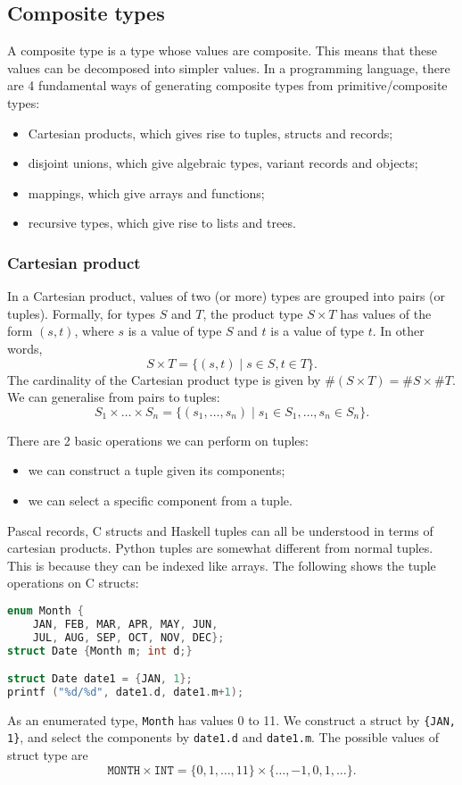 \documentclass[a4paper, openany]{memoir}
\begin{document}
\subsection{Composite types}
A composite type is a type whose values are composite. This means that these values can be decomposed into simpler values. In a programming language, there are 4 fundamental ways of generating composite types from primitive/composite types:
\begin{itemize}
    \item Cartesian products, which gives rise to tuples, structs and records;
    \item disjoint unions, which give algebraic types, variant records and objects;
    \item mappings, which give arrays and functions;
    \item recursive types, which give rise to lists and trees.
\end{itemize}

\subsubsection{Cartesian product}
In a Cartesian product, values of two (or more) types are grouped into pairs (or tuples). Formally, for types $S$ and $T$, the product type $S \times T$ has values of the form $(s, t)$, where $s$ is a value of type $S$ and $t$ is a value of type $t$. In other words,
\[S \times T = \{(s, t) \mid s \in S, t \in T\}.\]
The cardinality of the Cartesian product type is given by $\#(S \times T) = \#S \times \#T$. We can generalise from pairs to tuples:
\[S_1 \times \dots \times S_n = \{(s_1, \dots, s_n) \mid s_1 \in S_1, \dots, s_n \in S_n\}.\]

There are 2 basic operations we can perform on tuples:
\begin{itemize}
    \item we can construct a tuple given its components;
    \item we can select a specific component from a tuple.
\end{itemize}

Pascal records, C structs and Haskell tuples can all be understood in terms of cartesian products. Python tuples are somewhat different from normal tuples. This is because they can be indexed like arrays. The following shows the tuple operations on C structs:
\begin{lstlisting}[language=c]
enum Month {
    JAN, FEB, MAR, APR, MAY, JUN,
    JUL, AUG, SEP, OCT, NOV, DEC};
struct Date {Month m; int d;}

struct Date date1 = {JAN, 1};
printf ("%d/%d", date1.d, date1.m+1);
\end{lstlisting}
As an enumerated type, \texttt{Month} has values 0 to 11. We construct a struct by \texttt{\{JAN, 1\}}, and select the components by \texttt{date1.d} and \texttt{date1.m}. The possible values of struct type are 
\[\texttt{MONTH} \times \texttt{INT} = \{0, 1, \dots, 11\} \times \{\dots, -1, 0, 1, \dots\}.\]
\end{document}

